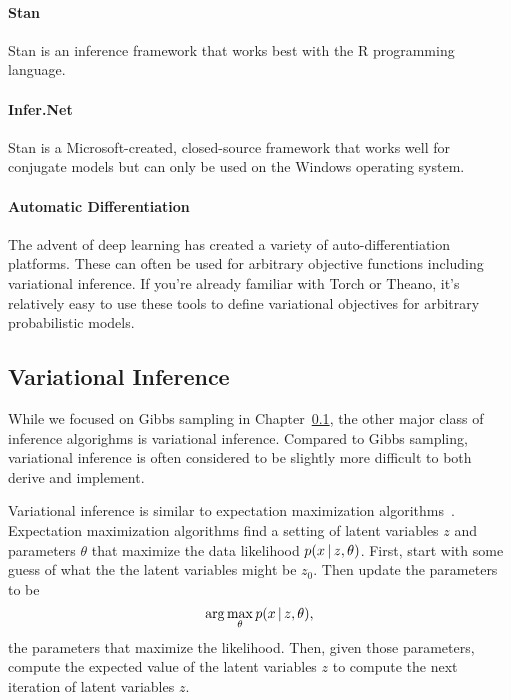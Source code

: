 
\paragraph{Stan}

Stan is an inference framework that works best with the R programming
language.

\paragraph{Infer.Net}

Stan is a Microsoft-created, closed-source framework that works well for conjugate
models but can only be used on the Windows operating system.

\paragraph{Automatic Differentiation}

The advent of deep learning has created a variety of
auto-differentiation platforms.  These can often be used for arbitrary
objective functions including variational inference.  If you're
already familiar with Torch or Theano, it's relatively easy to use
these tools to define variational objectives for arbitrary
probabilistic models.

\subsection{Variational Inference}

While we focused on Gibbs sampling in Chapter~\ref{}, the other major
class of inference algorighms is variational inference.  Compared to
Gibbs sampling, variational inference is often considered to be
slightly more difficult to both derive and implement.

Variational inference is similar to expectation maximization
algorithms~\cite{}.  Expectation maximization algorithms find a
setting of latent variables $z$ and parameters $\theta$ that maximize
the data likelihood $p(x \, | \, z, \theta)$.  First, start with some guess
of what the the latent variables might be $z_0$.  Then update the
parameters to be
\begin{equation}
  \arg \max_{\theta} p(x \, | \, z, \theta),
\label{eq:em}
\end{equation}
the parameters that maximize the likelihood.  Then, given those
parameters, compute the expected value of the latent variables $z$ to
compute the next iteration of latent variables $z$.

